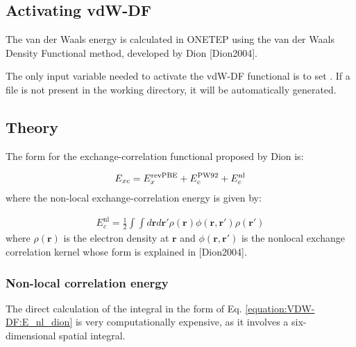 \documentclass[letterpaper,10pt,english]{sphinxmanual}
\begin{document}
\subsection{Activating vdW-DF}
\label{\detokenize{VDW-DF:activating-vdw-df}}
The van der Waals energy is calculated in ONETEP using the van der Waals
Density Functional method, developed by Dion 
{[}Dion2004{]}.

The only input variable needed to activate the vdW-DF functional is to
set . If a  file is not present
in the working directory, it will be automatically generated.


\subsection{Theory}
\label{\detokenize{VDW-DF:theory}}
The form for the exchange-correlation functional proposed by Dion  is:

\label{\detokenize{VDW-DF:equation-e-xc}}\begin{equation}\label{equation:VDW-DF:E_xc}
\begin{split}E_{xc} = E_{x}^{\rm{revPBE}} + E_c^{\rm{PW92}} + E_c^{\rm{nl}}\end{split}
\end{equation}
where the non-local exchange-correlation energy is given by:

\label{\detokenize{VDW-DF:equation-e-nl-dion}}\begin{equation}\label{equation:VDW-DF:E_nl_dion}
\begin{split}E_{c}^{\mathrm{nl}} = \frac{1}{2}\int\int d{\mathbf{r}}d{\mathbf{r}}'\rho({\mathbf{r}})\phi({\mathbf{r}},{\mathbf{r}}')\rho({\mathbf{r}}')\end{split}
\end{equation}
where \(\rho({\mathbf{r}})\) is the electron density at
\({\mathbf{r}}\) and \(\phi({\mathbf{r}},{\mathbf{r}}')\) is the
nonlocal exchange correlation kernel whose form is explained in
{[}Dion2004{]}.


\subsubsection{Non-local correlation energy}
\label{\detokenize{VDW-DF:non-local-correlation-energy}}
The direct calculation of the integral in the form of Eq. \eqref{equation:VDW-DF:E_nl_dion}
is very computationally expensive, as it involves a six-dimensional
spatial integral.
\end{document}
